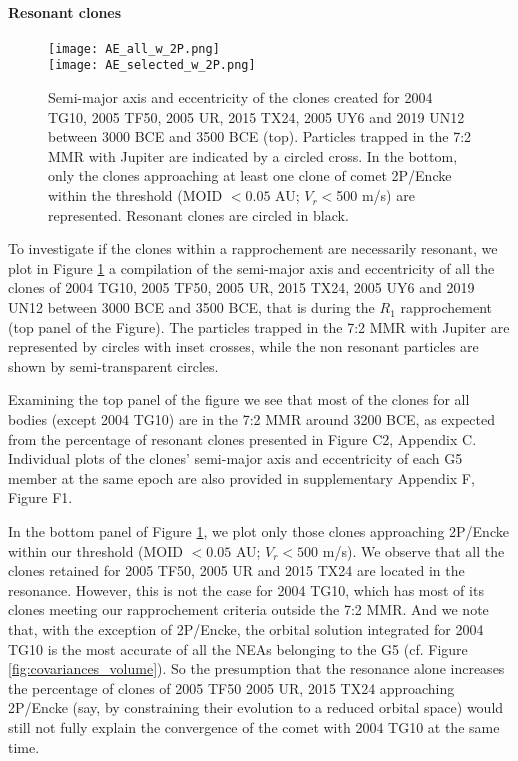 \documentclass[letters,a4paper,fleqn,usenatbib]{mnras}
\begin{document}
 
 \paragraph{Resonant clones} 
 
  \begin{figure}
     \centering
     \texttt{[image: AE\_all\_w\_2P.png]}\\
     \texttt{[image: AE\_selected\_w\_2P.png]}\\
     \caption{Semi-major axis and eccentricity of the clones created for 2004 TG10, 2005 TF50, 2005 UR, 2015 TX24, 2005 UY6 and 2019 UN12 between 3000 BCE and 3500 BCE (top). Particles trapped in the 7:2 MMR with Jupiter are indicated by a circled cross. In the bottom, only the clones approaching at least one clone of comet 2P/Encke within the threshold (MOID $<0.05$ AU; $V_r<$500 m/s) are represented. Resonant clones are circled in black.  }
     \label{fig:AE_clones}
 \end{figure}
 
 To investigate if the clones within a rapprochement are necessarily resonant, we plot in Figure \ref{fig:AE_clones} a compilation of the semi-major axis and eccentricity of all the clones of 2004 TG10, 2005 TF50, 2005 UR, 2015 TX24, 2005 UY6 and 2019 UN12 between 3000 BCE and 3500 BCE, that is during the $R_1$ rapprochement (top panel of the Figure). The particles trapped in the 7:2 MMR with Jupiter are represented by circles with inset crosses, while the non resonant particles are shown by semi-transparent circles. 
 
 Examining the top panel of the figure we see that most of the clones for all bodies (except 2004 TG10) are in the 7:2 MMR around 3200 BCE, as expected from the percentage of resonant clones presented in Figure C2, Appendix C. Individual plots of the clones' semi-major axis and eccentricity of each G5 member at the same epoch are also provided in supplementary Appendix F, Figure F1.
 
 In the bottom panel of Figure \ref{fig:AE_clones}, we plot only those clones approaching 2P/Encke within our threshold (MOID $< 0.05$ AU; $V_r < 500$ m/s). We observe that all the clones retained for 2005 TF50, 2005 UR and 2015 TX24 are located in the resonance. However, this is not the case for 2004 TG10, which has most of its clones meeting our rapprochement criteria outside the 7:2 MMR. And we note that, with the exception of 2P/Encke, the orbital solution integrated for 2004 TG10 is the most accurate of all the NEAs belonging to the G5 (cf. Figure \ref{fig:covariances_volume}).   So the presumption that the resonance alone increases the percentage of clones of 2005 TF50 2005 UR, 2015 TX24 approaching 2P/Encke (say, by constraining their evolution to a reduced orbital space) would still not fully explain the convergence of the comet with 2004 TG10 at the same time. 
 
\end{document}
